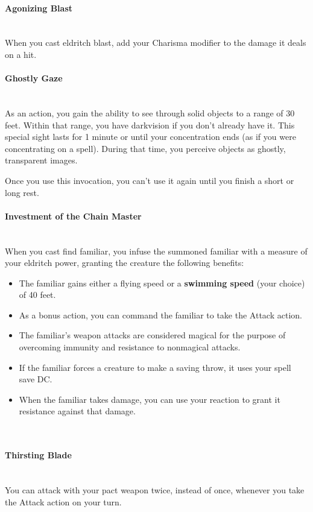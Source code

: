 {\paragraph*{Agonizing Blast}\hfill\\
When you cast eldritch blast, add your Charisma modifier to the damage it deals on a hit.\\
\paragraph*{Ghostly Gaze}\hfill\\
As an action, you gain the ability to see through solid objects to a range of 30 feet. Within that range, you have darkvision if you don't already have it. This special sight lasts for 1 minute or until your concentration ends (as if you were concentrating on a spell). During that time, you perceive objects as ghostly, transparent images.

Once you use this invocation, you can't use it again until you finish a short or long rest.\\
\paragraph*{Investment of the Chain Master}\hfill\\
When you cast find familiar, you infuse the summoned familiar with a measure of your eldritch power, granting the creature the following benefits:
\begin{itemize}
	\item The familiar gains either a flying speed or a \textbf{swimming speed} (your choice) of 40 feet.
	\item As a bonus action, you can command the familiar to take the Attack action.
	\item The familiar's weapon attacks are considered magical for the purpose of overcoming immunity and resistance to nonmagical attacks.
	\item If the familiar forces a creature to make a saving throw, it uses your spell save DC.
	\item When the familiar takes damage, you can use your reaction to grant it resistance against that damage.
\end{itemize}\hfill\\
\paragraph*{Thirsting Blade}\hfill\\
You can attack with your pact weapon twice, instead of once, whenever you take the Attack action on your turn.

}
